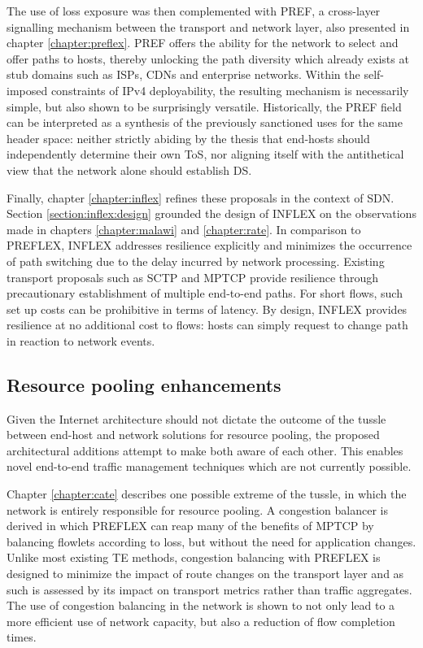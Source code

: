 The use of loss exposure was then complemented with \acf{PREF}, a cross-layer signalling mechanism between the transport and network layer, also presented in chapter \ref{chapter:preflex}.
\ac{PREF} offers the ability for the network to select and offer paths to hosts, thereby unlocking the path diversity which already exists at stub domains such as \acp{ISP}, \acp{CDN} and enterprise networks.
Within the self-imposed constraints of \ac{IPv4} deployability, the resulting mechanism is necessarily simple, but also shown to be surprisingly versatile.
Historically, the \ac{PREF} field can be interpreted as a synthesis of the previously sanctioned uses for the same header space: neither strictly abiding by the thesis that end-hosts should independently determine their own \acf{ToS}, nor aligning itself with the antithetical view that the network alone should establish \acf{DS}.

Finally, chapter \ref{chapter:inflex} refines these proposals in the context of \ac{SDN}.
Section \ref{section:inflex:design} grounded the design of INFLEX on the observations made in chapters \ref{chapter:malawi} and \ref{chapter:rate}.
In comparison to \ac{PREFLEX}, INFLEX addresses resilience explicitly and minimizes the occurrence of path switching due to the delay incurred by network processing.
Existing transport proposals such as \ac{SCTP} and \ac{MPTCP} provide resilience through precautionary establishment of multiple end-to-end paths.
For short flows, such set up costs can be prohibitive in terms of latency.
By design, INFLEX provides resilience at no additional cost to flows: hosts can simply request to change path in reaction to network events.

\subsection{Resource pooling enhancements}

Given the Internet architecture should not dictate the outcome of the tussle between end-host and network solutions for resource pooling, the proposed architectural additions attempt to make both aware of each other.
This enables novel end-to-end traffic management techniques which are not currently possible.

Chapter \ref{chapter:cate} describes one possible extreme of the tussle, in which the network is entirely responsible for resource pooling.
A congestion balancer is derived in which \ac{PREFLEX} can reap many of the benefits of \ac{MPTCP} by balancing flowlets according to loss, but without the need for application changes.
Unlike most existing \ac{TE} methods, congestion balancing with \ac{PREFLEX} is designed to minimize the impact of route changes on the transport layer and as such is assessed by its impact on transport metrics rather than traffic aggregates.
The use of congestion balancing in the network is shown to not only lead to a more efficient use of network capacity, but also a reduction of flow completion times.

